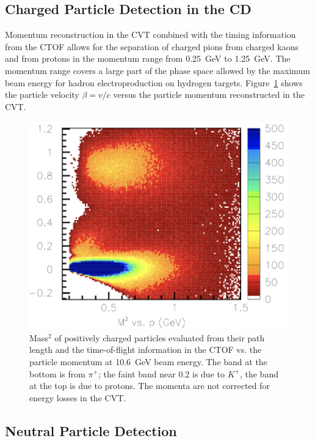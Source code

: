 \documentclass[final,3p,twocolumn]{elsarticle}
\begin{document}
\subsection{Charged Particle Detection in the CD} 

Momentum reconstruction in the CVT combined with the timing information from the CTOF allows for the separation 
of charged pions from charged kaons and from protons in the momentum range from 0.25~GeV to 1.25~GeV. The
momentum range covers a large part of the phase space allowed by the maximum beam energy for hadron
electroproduction on hydrogen targets. Figure~\ref{CD-PID} shows the particle velocity $\beta = v/c$ versus the
particle momentum reconstructed in the CVT.

\begin{figure}[t!]
\centerline{\includegraphics[width=1.\columnwidth]{ctof-pid-3.png}}
\caption{Mass$^2$ of positively charged particles evaluated from their path length and the time-of-flight
  information in the CTOF vs. the particle momentum at 10.6~GeV beam energy. The band at the bottom is from
  $\pi^+$; the faint band near 0.2 is due to $K^+$, the band at the top is due to protons. The momenta are not
  corrected for energy losses in the CVT.}
\label{CD-PID}
\end{figure} 

\subsection{Neutral Particle Detection} 
\end{document}
